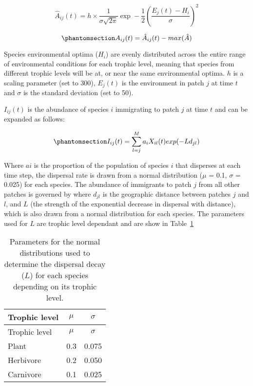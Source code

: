 \documentclass[
]{agujournal2019}
\begin{document}
\[
\hat{A}_{ij}(t)=h\times\frac{1}{\sigma\sqrt{2\pi}}\exp-\frac{1}{2}\left(\frac{E_{j}(t)-H_{i}}{\sigma}\right)^2
\]

\begin{equation}\phantomsection\label{eq-metacomm_env}{
A_{ij}(t)= \hat{A}_{ij}(t) - max(\hat{A})
}\end{equation}

Species environmental optima (\(H_i\)) are evenly distributed across the
entire range of environmental conditions for each trophic level, meaning
that species from different trophic levels will be at, or near the same
environmental optima. \(h\) is a scaling parameter (set to 300),
\(E_j(t)\) is the environment in patch \(j\) at time \(t\) and
\(\sigma\) is the standard deviation (set to 50).

\(I_{ij}(t)\) is the abundance of species \(i\) immigrating to patch
\(j\) at time \(t\) and can be expanded as follows:

\begin{equation}\phantomsection\label{eq-metacomm_imm}{
I_{ij}(t)=\sum_{l=j}^{M}a_iX_{il}(t)exp(-Ld_{jl})
}\end{equation}

Where \(ai\) is the proportion of the population of species \(i\) that
disperses at each time step, the dispersal rate is drawn from a normal
distribution (\(\mu\) = 0.1, \(\sigma\) = 0.025) for each species. The
abundance of immigrants to patch \(j\) from all other patches is
governed by where \(d_{jl}\) is the geographic distance between patches
\(j\) and \(l\), and \(L\) (the strength of the exponential decrease in
dispersal with distance), which is also drawn from a normal distribution
for each species. The parameters used for \(L\) are trophic level
dependant and are show in Table~\ref{tbl-interaction_decay}

\begin{longtable}[]{@{}lcc@{}}
\caption{Parameters for the normal distributions used to determine the
dispersal decay (\(L\)) for each species depending on its trophic
level.}\label{tbl-interaction_decay}\tabularnewline
\toprule\noalign{}
Trophic level & \(\mu\) & \(\sigma\) \\
\midrule\noalign{}
\endfirsthead
\toprule\noalign{}
Trophic level & \(\mu\) & \(\sigma\) \\
\midrule\noalign{}
\endhead
\bottomrule\noalign{}
\endlastfoot
Plant & 0.3 & 0.075 \\
Herbivore & 0.2 & 0.050 \\
Carnivore & 0.1 & 0.025 \\
\end{longtable}
\end{document}
